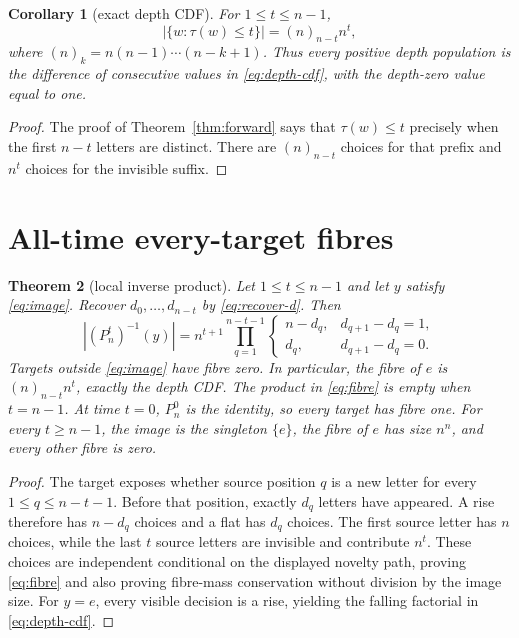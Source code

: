 \documentclass[a4paper,10pt]{amsart}
\newtheorem{theorem}{Theorem}
\newtheorem{corollary}[theorem]{Corollary}
\theoremstyle{remark}
\begin{document}
\begin{corollary}[exact depth CDF]\label{cor:depth}
For $1\le t\le n-1$,
\begin{equation}\label{eq:depth-cdf}
 |\{w:\tau(w)\le t\}|=(n)_{n-t}n^t,
\end{equation}
where $(n)_k=n(n-1)\cdots(n-k+1)$.  Thus every positive depth population is
the difference of consecutive values in \eqref{eq:depth-cdf}, with the
depth-zero value equal to one.
\end{corollary}

\begin{proof}
The proof of Theorem~\ref{thm:forward} says that $\tau(w)\le t$ precisely
when the first $n-t$ letters are distinct.  There are $(n)_{n-t}$ choices for
that prefix and $n^t$ choices for the invisible suffix.
\end{proof}

\section{All-time every-target fibres}

\begin{theorem}[local inverse product]\label{thm:fibre}
Let $1\le t\le n-1$ and let $y$ satisfy \eqref{eq:image}.  Recover
$d_0,\ldots,d_{n-t}$ by \eqref{eq:recover-d}.  Then
\begin{equation}\label{eq:fibre}
 |(P_n^t)^{-1}(y)|=
 n^{t+1}\prod_{q=1}^{n-t-1}
 \begin{cases}
 n-d_q,&d_{q+1}-d_q=1,\\
 d_q,&d_{q+1}-d_q=0.
 \end{cases}
\end{equation}
Targets outside \eqref{eq:image} have fibre zero.  In particular, the fibre
of $e$ is $(n)_{n-t}n^t$, exactly the depth CDF.
The product in \eqref{eq:fibre} is empty when $t=n-1$.  At time $t=0$,
$P_n^0$ is the identity, so every target has fibre one.  For every
$t\ge n-1$, the image is the singleton $\{e\}$, the fibre of $e$ has size
$n^n$, and every other fibre is zero.
\end{theorem}

\begin{proof}
The target exposes whether source position $q$ is a new letter for every
$1\le q\le n-t-1$.  Before that position, exactly $d_q$ letters have
appeared.  A rise therefore has $n-d_q$ choices and a flat has $d_q$
choices.  The first source letter has $n$ choices, while the last $t$ source
letters are invisible and contribute $n^t$.  These choices are independent
conditional on the displayed novelty path, proving \eqref{eq:fibre} and also
proving fibre-mass conservation without division by the image size.  For
$y=e$, every visible decision is a rise, yielding the falling factorial in
\eqref{eq:depth-cdf}.
\end{proof}
\end{document}

